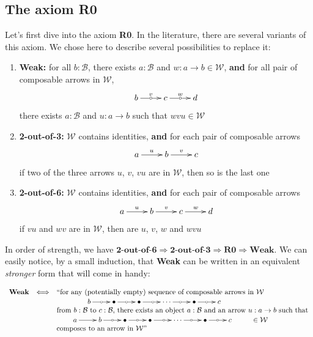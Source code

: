 \documentclass{article}
\numberwithin{equation}{section}
\theoremstyle{definition}
\theoremstyle{plain}
\begin{document}
\subsection{The axiom \textbf{R0}}

Let's first dive into the axiom \textbf{R0}. In the literature, there are several variants of this axiom. We chose here to describe several possibilities to replace it:

\begin{enumerate}[label = $\bullet$]
	\item \textbf{Weak:} for all $b:\mathcal{B}$, there exists $a:\mathcal{B}$ and $w: a \to b \in \mathcal{W}$, \textbf{and} for all pair of composable arrows in $\mathcal{W}$, 
	\[\xymatrix{b \ar[r]^v|{\circ} & c \ar[r]^w|{\circ} & d}\] there exists $a:\mathcal{B}$ and $u:a \to b$ such that $wvu \in \mathcal{W}$
	\item \textbf{2-out-of-3:} $\mathcal{W}$ contains identities, \textbf{and} for each pair of composable arrows \[\xymatrix{a \ar[r]^u & b \ar[r]^v & c}\] if two of the three arrows $u$, $v$, $vu$ are in $\mathcal{W}$, then so is the last one
	\item \textbf{2-out-of-6:} $\mathcal{W}$ contains identities, \textbf{and} for each pair of composable arrows \[\xymatrix{a \ar[r]^u & b \ar[r]^v & c \ar[r]^w & d}\] if $vu$ and $wv$ are in $\mathcal{W}$, then are $u$, $v$, $w$ and $wvu$
\end{enumerate}

In order of strength, we have $\textbf{2-out-of-6} \Rightarrow \textbf{2-out-of-3} \Rightarrow \textbf{R0} \Rightarrow \textbf{Weak}$. We can easily notice, by a small induction, that \textbf{Weak} can be written in an equivalent \textit{stronger} form that will come in handy:

\[\begin{array}{rcl}
	\textnormal{\textbf{Weak}} & \Longleftrightarrow & \text{``for any (potentially empty) sequence of composable arrows in $\mathcal{W}$}\\
	&& \qquad  \qquad \xymatrix{b \ar[r]|{\circ} & \bullet \ar[r]|{\circ} & \bullet \ar[r]|{\circ} & \cdots \ar[r]|{\circ} & \bullet \ar[r]|{\circ} & c}\\
	&& \text{from $b:\mathcal{B}$ to $c:\mathcal{B}$, there exists an object $a:\mathcal{B}$ and an arrow $u: a \to b$ such that}\\
	&& \qquad \xymatrix{a \ar[r] & b \ar[r]|{\circ} & \bullet \ar[r]|{\circ} & \bullet \ar[r]|{\circ} & \cdots \ar[r]|{\circ} & \bullet \ar[r]|{\circ} & c & \in \mathcal{W}}\\
	&& \text{composes to an arrow in $\mathcal{W}$''}
\end{array}\]
\end{document}
